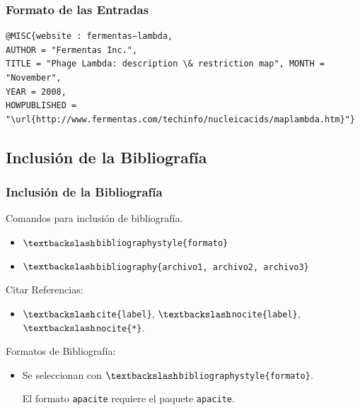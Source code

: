 \documentclass[aspectratio=43]{beamer}%
\begin{document}
\begin{frame}[fragile]
\frametitle{\textbf{Formato de las Entradas}}
\justifying
 \begin{exampleblock}{}
   \vspace{-0.7cm}
\begin{lstlisting}
@MISC{website : fermentas−lambda,
AUTHOR = "Fermentas Inc.",
TITLE = "Phage Lambda: description \& restriction map", MONTH = "November",
YEAR = 2008,
HOWPUBLISHED = "\url{http://www.fermentas.com/techinfo/nucleicacids/maplambda.htm}"}
\end{lstlisting}\vspace{-0.3cm}
\end{exampleblock}
\end{frame}


\subsection{Inclusión de la Bibliografía}
\begin{frame}[fragile]
\frametitle{\textbf{Inclusión de la Bibliografía}}
\justifying
 Comandos para inclusión de bibliografía.
 \begin{itemize}\justifying
  \item \texttt{$\textbackslash$bibliographystyle\{formato\}}
  \item \texttt{$\textbackslash$bibliography\{archivo1, archivo2, archivo3\}}
\end{itemize}
\pause Citar Referencias:
\begin{itemize}\justifying
  \item \texttt{$\textbackslash$cite\{label\}}, \texttt{$\textbackslash$nocite\{label\}}, \texttt{$\textbackslash$nocite\{*\}}.
\end{itemize}
\pause Formatos de Bibliografía:
\begin{itemize}\justifying
  \item Se seleccionan con \texttt{$\textbackslash$bibliographystyle\{formato\}}.
El formato \texttt{apacite} requiere el paquete \texttt{apacite}.

\end{itemize}
\end{frame}
\end{document}
